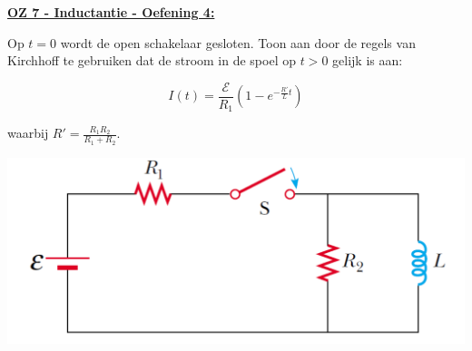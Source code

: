 \textbf{\underline{OZ 7 - Inductantie - Oefening 4:}}
\vspace{0.5cm}

Op $t = 0$ wordt de open schakelaar gesloten. Toon aan door de regels van Kirchhoff te gebruiken dat de stroom in de spoel op $t > 0$ gelijk is aan:

\begin{equation*}
    I(t) = \frac{\mathcal{E}}{R_1} \left( 1 - e^{-\tfrac{R'}{L}t} \right)
\end{equation*}

waarbij $R' = \frac{R_1R_2}{R_1 + R_2}$.

\begin{center}
    \includegraphics[scale = 0.3]{oz07/resources/Oz7Oef4.png}
\end{center}


\begin{description}[labelwidth=1.5cm, leftmargin=!]
    \item[Geg. :] 
    \item[Gevr. :] 
    \item[Opl. :]
\end{description}


\vspace{1cm}